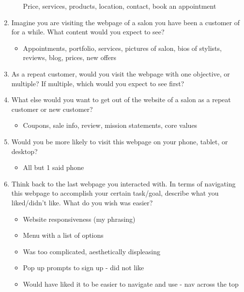 \begin{enumerate}
\begin{itemize}
    Price, services, products, location, contact, book an appointment
  \end{itemize}
\item
  Imagine you are visiting the webpage of a salon you have been a customer of for a while. What content would you expect to see?
  \begin{itemize}
  \item
    Appointments, portfolio, services, pictures of salon, bios of stylists, reviews, blog, prices, new offers
  \end{itemize}
\item
  As a repeat customer, would you visit the webpage with one objective, or multiple? If multiple, which would you expect to see first?
\item
  What else would you want to get out of the website of a salon as a repeat customer or new customer?
  \begin{itemize}
  \item
    Coupons, sale info, review, mission statements, core values
  \end{itemize}
\item
  Would you be more likely to visit this webpage on your phone, tablet, or desktop?
  \begin{itemize}
  \item
    All but 1 said phone
  \end{itemize}
\item
  Think back to the last webpage you interacted with. In terms of navigating this webpage to accomplish your certain task/goal, describe what you liked/didn't like. What do you wish was easier?
  \begin{itemize}
  \item
    Website responsiveness (my phrasing)
  \item
    Menu with a list of options
  \item
    Was too complicated, aesthetically displeasing
  \item
    Pop up prompts to sign up - did not like
  \item
    Would have liked it to be easier to navigate and use - nav across the top
  \end{itemize}
\end{enumerate}


